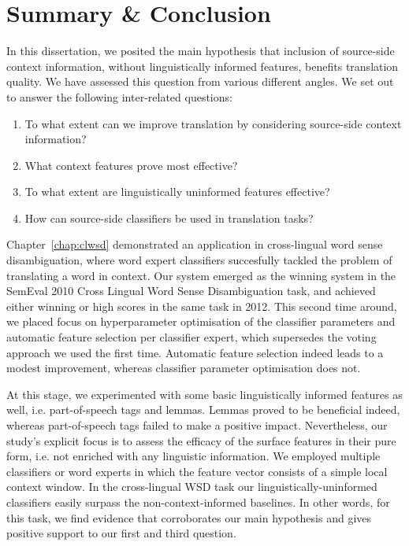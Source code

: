 \chapter{Summary \& Conclusion}
\label{chap:conclusion}

In this dissertation, we posited the main hypothesis that inclusion of source-side context information, without
linguistically informed features, benefits translation quality. We have
assessed this question from various different angles. We set out to answer
the following inter-related questions:

\begin{enumerate}
\item To what extent can we improve translation by considering source-side
    context information?
\item What context features prove most effective?
\item To what extent are linguistically uninformed features effective?
\item How can source-side classifiers be used in translation tasks?
\end{enumerate}

Chapter~\ref{chap:clwsd} demonstrated an application in cross-lingual word sense
disambiguation, where word expert classifiers succesfully tackled the problem
of translating a word in context. Our system emerged as the winning system in
the SemEval 2010 Cross Lingual Word Sense Disambiguation task, and achieved
either winning or high scores in the same task in 2012. This second time
around, we placed focus on hyperparameter optimisation of the classifier
parameters and automatic feature selection per classifier expert, which
supersedes the voting approach we used the first time. Automatic feature
selection indeed leads to a modest improvement, whereas classifier parameter
optimisation does not.

At this stage, we experimented with some basic linguistically informed
features as well, i.e. part-of-speech tags and lemmas. Lemmas proved to be
beneficial indeed, whereas part-of-speech tags failed to make a positive
impact. Nevertheless, our study's explicit focus is to assess the efficacy of
the surface features in their pure form, i.e. not enriched with any linguistic
information. We employed multiple classifiers or word experts in which the
feature vector consists of a simple local context window. In the cross-lingual
WSD task our linguistically-uninformed classifiers easily surpass the
non-context-informed baselines. In other words, for this task, we find evidence that
corroborates our main hypothesis and gives positive support to our first and third question.

